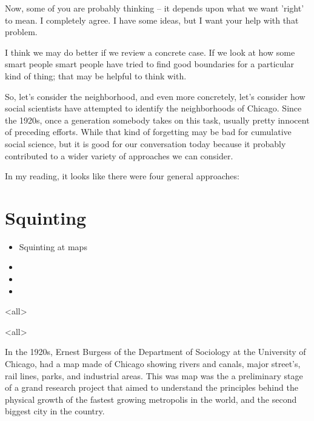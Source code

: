 Now, some of you are probably thinking -- it depends upon what we want
'right' to mean. I completely agree. I have some ideas, but I want
your help with that problem.

I think we may do better if we review a concrete case. If we look at
how some smart people smart people have tried to find good boundaries
for a particular kind of thing; that may be helpful to think with.

So, let's consider the neighborhood, and even more concretely, let's
consider how social scientists have attempted to identify the
neighborhoods of Chicago. Since the 1920s, once a generation somebody
takes on this task, usually pretty innocent of preceding efforts.
While that kind of forgetting may be bad for cumulative social
science, but it is good for our conversation today because it probably
contributed to a wider variety of approaches we can consider.

In my reading, it looks like there were four general approaches:

\begin{frame}
\begin{itemize}{}
\pause
{}
\pause
{}
\pause 
{}
\end{itemize}
\end{frame}

\section{Squinting}
{
\begin{frame}
\begin{itemize}{}
\item[] Squinting at maps
\item[] \color{gray}{Hand-tuned clustering of maps}
\item[] \color{gray}{Asking people to make the maps for us}
\item[] \color{gray}{Predicting neighborhoods}
\end{itemize}
\end{frame}
}

\mode<all>{
}

\mode<all>{
}


In the 1920s, Ernest Burgess of the Department of Sociology at the
University of Chicago, had a map made of Chicago showing
rivers and canals, major street's, rail lines, parks, and industrial
areas. This was map was the a preliminary stage of a grand research
project that aimed to understand the principles behind the physical
growth of the fastest growing metropolis in the world, and the second
biggest city in the country.

